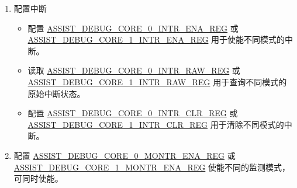\documentclass[main\_\_CN.tex]{subfiles}
\begin{document}
\begin{enumerate}
\begin{itemize}
            \item HP CPU1 外设总线区域 1 由 \hyperref[regdesc:ASSISTDEBUGCORE1AREAPIF1MINREG]{ASSIST\_DEBUG\_CORE\_1\_AREA\_PIF\_1\_MIN\_REG} 和\\ \hyperref[regdesc:ASSISTDEBUGCORE1AREAPIF1MAXREG]{ASSIST\_DEBUG\_CORE\_1\_AREA\_PIF\_1\_MAX\_REG} 进行配置。
            \item HP CPU1 栈指针监测区域由 \hyperref[regdesc:ASSISTDEBUGCORE1SPMINREG]{ASSIST\_DEBUG\_CORE\_1\_SP\_MIN\_REG} 和\\ \hyperref[regdesc:ASSISTDEBUGCORE1SPMAXREG]{ASSIST\_DEBUG\_CORE\_1\_SP\_MAX\_REG} 进行配置。
        \end{itemize}
    \item 配置中断
    \begin{itemize}
        \item 配置 \hyperref[regdesc:ASSISTDEBUGCORE0INTRENAREG]{ASSIST\_DEBUG\_CORE\_0\_INTR\_ENA\_REG} 或 \hyperref[regdesc:ASSISTDEBUGCORE1INTRENAREG]{ASSIST\_DEBUG\_CORE\_1\_INTR\_ENA\_REG} 用于使能不同模式的中断。
        \item 读取 \hyperref[regdesc:ASSISTDEBUGCORE0INTRRAWREG]{ASSIST\_DEBUG\_CORE\_0\_INTR\_RAW\_REG} 或 \hyperref[regdesc:ASSISTDEBUGCORE1INTRRAWREG]{ASSIST\_DEBUG\_CORE\_1\_INTR\_RAW\_REG} 用于查询不同模式的原始中断状态。
        \item 配置 \hyperref[regdesc:ASSISTDEBUGCORE0INTRCLRREG]{ASSIST\_DEBUG\_CORE\_0\_INTR\_CLR\_REG} 或 \hyperref[regdesc:ASSISTDEBUGCORE1INTRCLRREG]{ASSIST\_DEBUG\_CORE\_1\_INTR\_CLR\_REG} 用于清除不同模式的中断。
        \end{itemize}
    \item 配置 \hyperref[regdesc:ASSISTDEBUGCORE0MONTRENAREG]{ASSIST\_DEBUG\_CORE\_0\_MONTR\_ENA\_REG} 或 \hyperref[regdesc:ASSISTDEBUGCORE1MONTRENAREG]{ASSIST\_DEBUG\_CORE\_1\_MONTR\_ENA\_REG} 使能不同的监测模式，可同时使能。
\end{enumerate}
\end{document}
